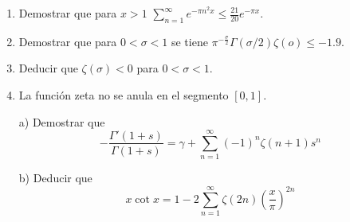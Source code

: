 \documentclass[twoside]{article}
\begin{document}
\begin{ejercicio}{3}
\begin{enumerate}
	\item Demostrar que para $x > 1$ $\sum_{n=1}^{∞} e^{-πn^2 x} ≤ \frac{21}{20} e^{-πx}$.
	\item Demostrar que para $0 < σ < 1$ se tiene $π^{-\frac{σ}{2}}Γ(σ/2) ζ(ο) ≤ -1.9$.
	\item Deducir que $ζ(σ) < 0$ para $0 < σ < 1$.
	\item La función zeta no se anula en el segmento $[0,1]$.
\end{enumerate}
\end{ejercicio}
\begin{solucion}
\end{solucion}
\newpage

\begin{ejercicio}{4}
\begin{itemize}
\item[]
\item[a)] Demostrar que
$$
-\frac{\Gamma'(1+s)}{\Gamma(1+s)} = \gamma + \sum_{n=1}^\infty (-1)^n\zeta(n+1)s^n
$$
\item[b)] Deducir que
$$
x\cot x = 1 - 2\sum_{n=1}^\infty\zeta(2n)\left(\frac{x}{\pi}\right)^{2n}
$$
\end{itemize}
\end{ejercicio}
\end{document}
